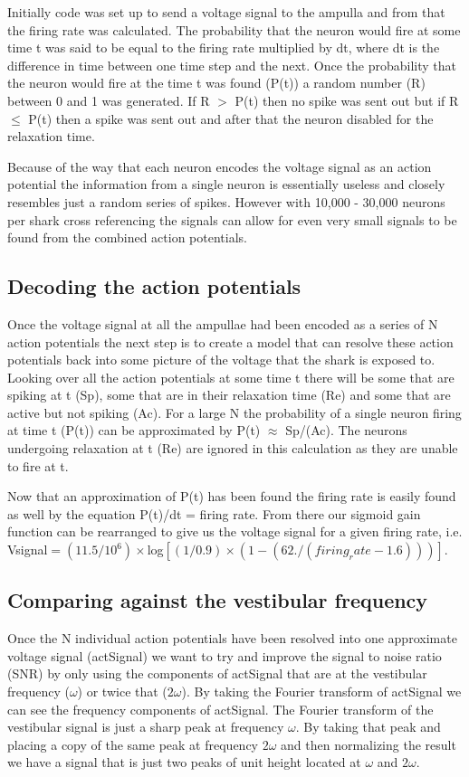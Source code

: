 \documentclass[12pt]{article}
\begin{document}
 Initially code was set up to send a voltage signal to the ampulla and from that the firing rate was calculated. The probability that the neuron would fire at some time t was said to be equal to the firing rate multiplied by dt, where dt is the difference in time between one time step and the next. Once the probability that the neuron would fire at the time t was found (P(t)) a random number (R) between 0 and 1 was generated. If R $>$ P(t) then no spike was sent out but if R$\le$ P(t) then a spike was sent out and after that the neuron disabled for the relaxation time.

Because of the way that each neuron encodes the voltage signal as an action potential the information from a single neuron is essentially useless and closely resembles just a random series of spikes. However with 10,000 - 30,000 neurons per shark\cite{Murray:1974}\cite{Montgomery:1999} cross referencing the signals can allow for even very small signals to be found from the combined action potentials.


\subsection{Decoding the action potentials}
Once the voltage signal at all the ampullae had been encoded as a series of N action potentials the next step is to create a model that can resolve these action potentials back into some picture of the voltage that the shark is exposed to. Looking over all the action potentials at some time t there will be some that are spiking at t (Sp), some that are in their relaxation time (Re) and some that are active but not spiking (Ac). For a large N the probability of a single neuron firing at time t (P(t)) can be approximated by P(t) $\approx$ Sp/(Ac). The neurons undergoing relaxation at t (Re) are ignored in this calculation as they are unable to fire at t.

Now that an approximation of P(t) has been found the firing rate is easily found as well by the equation P(t)/dt = firing rate. From there our sigmoid gain function can be rearranged to give us the voltage signal for a given firing rate, i.e. Vsignal$ =  (11.5/10^6)\times $log$[(1/0.9)\times (1 - (62./(firing_rate - 1.6)))]$.

\subsection{Comparing against the vestibular frequency}
Once the N individual action potentials have been resolved into one approximate voltage signal (actSignal) we want to try and improve the signal to noise ratio (SNR) by only using the components of actSignal that are at the vestibular frequency ($\omega$) or twice that ($2\omega$). By taking the Fourier transform of actSignal we can see the frequency components of actSignal. The Fourier transform of the vestibular signal is just a sharp peak at frequency $\omega$. By taking that peak and placing a copy of the same peak at frequency $2\omega$ and then normalizing the result we have a signal that is just two peaks of unit height located at $\omega$ and $2\omega$. 
\end{document}
